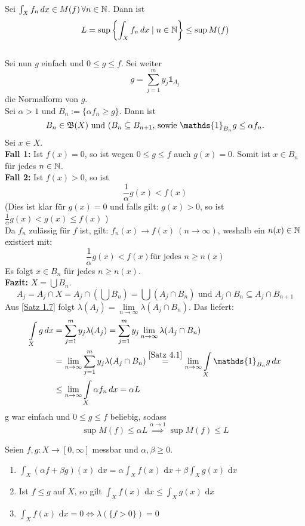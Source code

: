 \documentclass[a4paper,twoside,DIV15,BCOR12mm,chapterprefix=true,headings=onelinechapter]{scrbook}
\begin{document}
\begin{beweis}
Sei \(\int_Xf_n\,dx\in M(f) \,\forall n\in\mathbb{N} \). Dann ist \[L = \sup\left\{\int_Xf_n\,dx\mid n\in\mathbb{N}\right\} \leq \sup M(f)\]\\
Sei nun $g$ einfach und \(0\leq g\leq f\). Sei weiter \[g=\sum^m_{j=1}y_j\mathds{1}_{A_j}\] die Normalform von $g$.\\
Sei \(\alpha>1\) und \(B_n:=\{\alpha f_n\geq g\}\). Dann ist \[B_n\in\fb(X) \text{ und }(B_n\subseteq B_{n+1}\text{, sowie } \mathds{1}_{B_n}g\leq\alpha f_n.\]
Sei \(x\in X\).\\
\textbf{Fall 1:} Ist \(f(x)=0\), so ist wegen \(0\leq g\leq f\) auch \(g(x)=0\). Somit ist \(x\in B_n\) für jedes \(n\in\mathbb{N}\).\\
\textbf{Fall 2:} Ist  \(f(x)>0\), so ist \[\frac{1}{\alpha}g(x)<f(x)\] (Dies ist klar für \(g(x)=0\) und falls gilt: \(g(x)>0\), so ist \(\frac{1}{\alpha}g(x)<g(x)\leq f(x) \) )\\
Da $f_n$ zulässig für $f$ ist, gilt: \(f_n(x)\to f(x)\  (n\to\infty)\), weshalb ein \(n(x)\in\mathbb{N}\) existiert mit:
\[\frac{1}{\alpha}g(x)<f(x)\text{für jedes } n\geq n(x)\]
Es folgt \(x\in B_n\) für jedes \(n\geq n(x)\).\\
\textbf{Fazit:} \(X=\bigcup B_n\). \[A_j=A_j\cap X=A_j\cap\left(\bigcup B_n\right) = \bigcup(A_j\cap B_n) \text{ und } A_j\cap B_n\subseteq A_j\cap B_{n+1} \]
Aus \ref{Satz 1.7} folgt \(\lambda(A_j)=\lim\limits_{n\to\infty}\lambda(A_j\cap B_n)\). Das liefert:
\begin{align*}
   \int\limits_Xg\,dx &= \sum\limits_{j=1}^m y_j\lambda(A_j) 
   = \sum\limits_{j=1}^m y_j\lim\limits_{n\to\infty}\lambda(A_j\cap B_n)\\ 
   &=\lim\limits_{n\to\infty}\sum\limits_{j=1}^m y_j\lambda(A_j\cap B_n)
   \overset{\ref{Satz 4.1}}= \lim\limits_{n\to\infty} \int\limits_X \mathds{1}_{B_n}g\,dx\\
   &\leq  \lim\limits_{n\to\infty} \int\limits_X \alpha f_n\,dx
   =\alpha L
\end{align*}
g war einfach und \(0\leq g\leq f\) beliebig, sodass \[\sup M(f)\leq\alpha L \overset{\alpha\to 1}\implies \sup M(f)\leq L \]
\end{beweis}

\begin{satz}
\label{Satz 4.5}
Seien $f,g:X\to[0,\infty]$ messbar und $\alpha,\beta\ge0$.
\begin{enumerate}
\item $\int_X (\alpha f+\beta g)(x) \text{ d}x=\alpha\int_X f(x) \text{ d}x+\beta\int_X g(x) \text{ d}x$
\item Ist $f\le g$ auf $X$, so gilt $\int_X f(x) \text{ d}x\le \int_X g(x) \text{ d}x$
\item $\int_X f(x) \text{ d}x=0 \iff \lambda(\{f>0\})=0$
\end{enumerate}
\end{satz}
\end{document}

